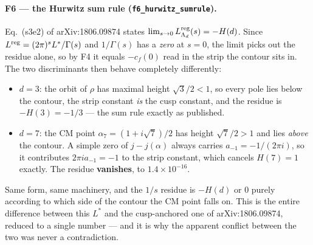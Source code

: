 \documentclass[11pt]{article}
\newcommand{\code}[1]{\texttt{#1}}
\begin{document}
\paragraph{F6 --- the Hurwitz sum rule (\code{f6\_hurwitz\_sumrule}).}
Eq.~(s3e2) of arXiv:1806.09874 states $\lim_{s\to0}L^{\rm reg}_{\Lambda_d}(s)=-H(d)$. Since
$L^{\rm reg}=(2\pi)^sL^*/\Gamma(s)$ and $1/\Gamma(s)$ has a \emph{zero} at $s=0$, the limit
picks out the residue alone, so by F4 it equals $-c_f(0)$ read in the strip the contour sits
in. The two discriminants then behave completely differently:
\begin{itemize}
\item $d=3$: the orbit of $\rho$ has maximal height $\sqrt3/2<1$, so every pole lies below the
contour, the strip constant \emph{is} the cusp constant, and the residue is $-H(3)=-1/3$ ---
the sum rule exactly as published.
\item $d=7$: the CM point $\alpha_7=(1+i\sqrt7)/2$ has height $\sqrt7/2>1$ and lies
\emph{above} the contour. A simple zero of $j-j(\alpha)$ always carries
$a_{-1}=-1/(2\pi i)$, so it contributes $2\pi ia_{-1}=-1$ to the strip constant, which cancels
$H(7)=1$ exactly. The residue \textbf{vanishes}, to $1.4\times10^{-16}$.
\end{itemize}
Same form, same machinery, and the $1/s$ residue is $-H(d)$ or $0$ purely according to which
side of the contour the CM point falls on. This is the entire difference between this $L^*$ and
the cusp-anchored one of arXiv:1806.09874, reduced to a single number --- and it is why the
apparent conflict between the two was never a contradiction.
\end{document}
